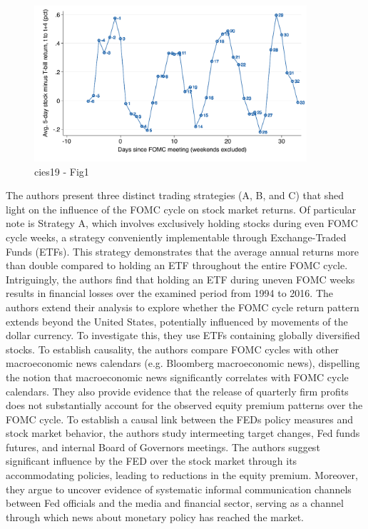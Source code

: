 \begin{figure}[h]
    \centering
    \includegraphics[width=0.9\textwidth]{figures/cies19/fig1}
    \caption{cies19 - Fig1}
\end{figure}


The authors present three distinct trading strategies (A, B, and C) that shed light on the influence of the FOMC cycle on stock market returns. Of particular note is Strategy A, which involves exclusively holding stocks during even FOMC cycle weeks, a strategy conveniently implementable through Exchange-Traded Funds (ETFs). This strategy demonstrates that the average annual returns more than double compared to holding an ETF throughout the entire FOMC cycle. Intriguingly, the authors find that holding an ETF during uneven FOMC weeks results in financial losses over the examined period from 1994 to 2016.
The authors extend their analysis to explore whether the FOMC cycle return pattern extends beyond the United States, potentially influenced by movements of the dollar currency. To investigate this, they use ETFs containing globally diversified stocks. To establish causality, the authors compare FOMC cycles with other macroeconomic news calendars (e.g. Bloomberg macroeconomic news), dispelling the notion that macroeconomic news significantly correlates with FOMC cycle calendars. They also provide evidence that the release of quarterly firm profits does not substantially account for the observed equity premium patterns over the FOMC cycle.
To establish a causal link between the FEDs policy measures and stock market behavior, the authors study intermeeting target changes, Fed funds futures, and internal Board of Governors meetings. 
The authors suggest significant influence by the FED over the stock market through its accommodating policies, leading to reductions in the equity premium. Moreover, they argue to uncover evidence of systematic informal communication channels between Fed officials and the media and financial sector, serving as a channel through which news about monetary policy has reached the market.

